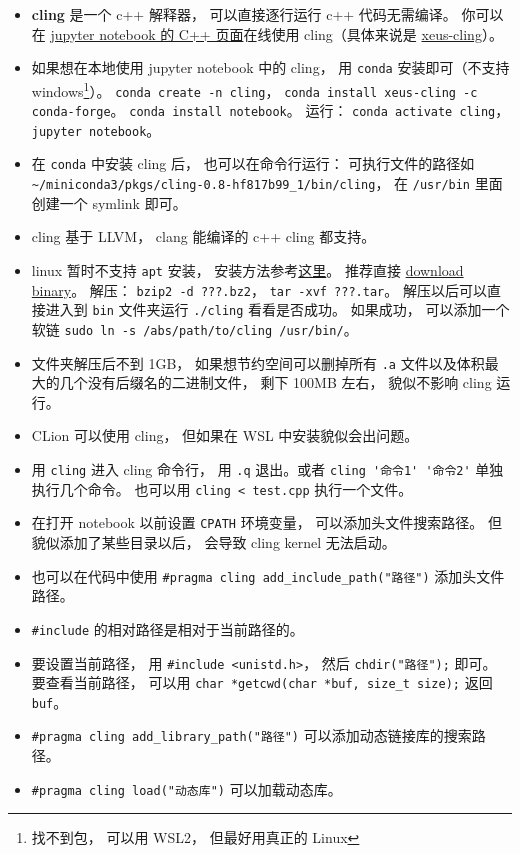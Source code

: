 
\begin{issues}
\issueDraft
\end{issues}

\begin{itemize}
\item \textbf{cling} 是一个 c++ 解释器， 可以直接逐行运行 c++ 代码无需编译。 你可以在 \href{https://jupyter.org/try}{jupyter notebook 的 C++ 页面}在线使用 cling（具体来说是 \href{https://xeus-cling.readthedocs.io/en/latest/index.html}{xeus-cling}）。
\item 如果想在本地使用 jupyter notebook 中的 cling， 用 \verb|conda| 安装即可（不支持 windows\footnote{找不到包， 可以用 WSL2， 但最好用真正的 Linux}）。 \verb|conda create -n cling|， \verb|conda install xeus-cling -c conda-forge|。 \verb|conda install notebook|。 运行： \verb|conda activate cling|， \verb|jupyter notebook|。
\item 在 \verb|conda| 中安装 cling 后， 也可以在命令行运行： 可执行文件的路径如 \verb|~/miniconda3/pkgs/cling-0.8-hf817b99_1/bin/cling|， 在 \verb|/usr/bin| 里面创建一个 symlink 即可。
\item cling 基于 LLVM， clang 能编译的 c++ cling 都支持。
\item linux 暂时不支持 \verb|apt| 安装， 安装方法参考\href{https://kaustubh13.medium.com/how-to-install-cling-on-linux-or-wsl-8125798ed9b9}{这里}。 推荐直接 \href{https://root.cern/download/cling/}{download binary}。 解压： \verb|bzip2 -d ???.bz2|， \verb|tar -xvf ???.tar|。 解压以后可以直接进入到 \verb|bin| 文件夹运行 \verb|./cling| 看看是否成功。 如果成功， 可以添加一个软链 \verb|sudo ln -s /abs/path/to/cling /usr/bin/|。
\item 文件夹解压后不到 1GB， 如果想节约空间可以删掉所有 \verb|.a| 文件以及体积最大的几个没有后缀名的二进制文件， 剩下 100MB 左右， 貌似不影响 cling 运行。
\item CLion 可以使用 cling， 但如果在 WSL 中安装貌似会出问题。
\item 用 \verb|cling| 进入 cling 命令行， 用 \verb|.q| 退出。或者 \verb|cling '命令1' '命令2'| 单独执行几个命令。 也可以用 \verb|cling < test.cpp| 执行一个文件。
\item 在打开 notebook 以前设置 \verb|CPATH| 环境变量， 可以添加头文件搜索路径。 但貌似添加了某些目录以后， 会导致 cling kernel 无法启动。
\item 也可以在代码中使用 \verb|#pragma cling add_include_path("路径")| 添加头文件路径。
\item \verb|#include| 的相对路径是相对于当前路径的。
\item 要设置当前路径， 用 \verb|#include <unistd.h>|， 然后 \verb|chdir("路径");| 即可。 要查看当前路径， 可以用 \verb|char *getcwd(char *buf, size_t size);| 返回 \verb|buf|。
\item \verb|#pragma cling add_library_path("路径")| 可以添加动态链接库的搜索路径。
\item \verb|#pragma cling load("动态库")| 可以加载动态库。
\end{itemize}
